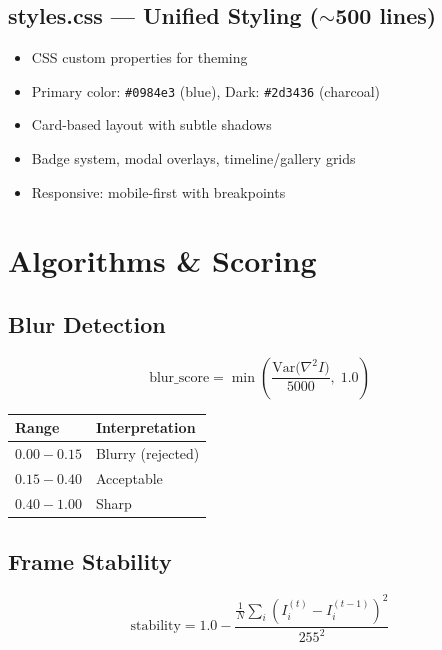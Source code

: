 \documentclass[12pt, a4paper]{article}
\begin{document}
\subsection{styles.css --- Unified Styling ($\sim$500 lines)}

\begin{itemize}
    \item CSS custom properties for theming
    \item Primary color: \texttt{\#0984e3} (blue), Dark: \texttt{\#2d3436} (charcoal)
    \item Card-based layout with subtle shadows
    \item Badge system, modal overlays, timeline/gallery grids
    \item Responsive: mobile-first with breakpoints
\end{itemize}

\section{Algorithms \& Scoring}

\subsection{Blur Detection}

\begin{equation}
    \text{blur\_score} = \min\!\left(\frac{\text{Var}\bigl(\nabla^2 I\bigr)}{5000},\; 1.0\right)
\end{equation}

\begin{tabularx}{\textwidth}{@{} l X @{}}
    \toprule
    \textbf{Range} & \textbf{Interpretation} \\
    \midrule
    $0.00 - 0.15$ & Blurry (rejected) \\
    $0.15 - 0.40$ & Acceptable \\
    $0.40 - 1.00$ & Sharp \\
    \bottomrule
\end{tabularx}

\subsection{Frame Stability}

\begin{equation}
    \text{stability} = 1.0 - \frac{\frac{1}{N}\sum_{i}(I^{(t)}_i - I^{(t-1)}_i)^2}{255^2}
\end{equation}
\end{document}
